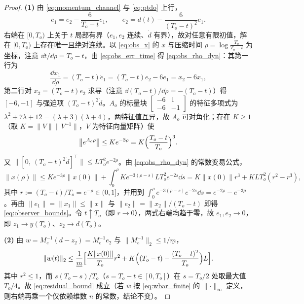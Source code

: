 \begin{proof}
\textbf{(1)} 由 \eqref{eq:momentum_channel} 与 \eqref{eq:ptdo} 上行，
\begin{equation}
\dot e_1=e_2-\frac{6}{T_o-t}e_1,\qquad
\dot e_2=\dot d(t)-\frac{6}{(T_o-t)^{2}}e_1 .
\label{eq:obs_err_time}
\end{equation}
右端在 \([0,T_o)\) 上关于 \(t\) 局部有界（\(e_1,e_2\) 连续、\(\dot d\) 有界），故对任意有限初值，解在 \([0,T_o)\) 上存在唯一且绝对连续。以 \eqref{eq:obs_x} 的 \(x\) 与压缩时间 \(\rho=\log\frac{T_o}{T_o-t}\) 为坐标，注意 \(\dd t/\dd\rho=T_o-t\)，由 \eqref{eq:obs_err_time} 得 \eqref{eq:obs_rho_dyn}：其第一行为
\[
\frac{\dd x_1}{\dd\rho}=(T_o-t)\dot e_1=(T_o-t)e_2-6e_1=x_2-6x_1 ,
\]
第二行对 \(x_2=(T_o-t)e_2\) 求导（注意 \(\dd(T_o-t)/\dd\rho=-(T_o-t)\)）得 \([-6,-1]\) 与强迫项 \((T_o-t)^{2}\dot d\)。\(A_o\) 的标量块 \(\begin{bmatrix}-6&1\\-6&-1\end{bmatrix}\) 的特征多项式为 \(\lambda^{2}+7\lambda+12=(\lambda+3)(\lambda+4)\)，两特征值互异，故 \(A_o\) 可对角化；存在 \(K\ge1\)（取 \(K=\lVert V\rVert\lVert V^{-1}\rVert\)，\(V\) 为特征向量矩阵）使
\[
\bigl\lVert e^{A_o\rho}\bigr\rVert\le Ke^{-3\rho}=K\Bigl(\frac{T_o-t}{T_o}\Bigr)^{3}.
\]
又 \(\bigl\lVert[0,\ (T_o-t)^{2}\dot d]^{\top}\bigr\rVert\le LT_o^{2}e^{-2\rho}\)。由 \eqref{eq:obs_rho_dyn} 的常数变易公式，
\[
\lVert x(\rho)\rVert\le Ke^{-3\rho}\lVert x(0)\rVert
+\int_0^{\rho}Ke^{-3(\rho-s)}LT_o^{2}e^{-2s}\dd s
=K\lVert x(0)\rVert r^{3}+KLT_o^{2}(r^{2}-r^{3}),
\]
其中 \(r:=(T_o-t)/T_o=e^{-\rho}\in(0,1]\)，并用到 \(\int_0^{\rho}e^{-3(\rho-s)}e^{-2s}\dd s=e^{-2\rho}-e^{-3\rho}\)。再由 \(\lVert e_1\rVert=\lVert x_1\rVert\le\lVert x\rVert\) 与 \(\lVert e_2\rVert=\lVert x_2\rVert/(T_o-t)\) 即得 \eqref{eq:observer_bounds}。令 \(t\uparrow T_o\)（即 \(r\to0\)），两式右端均趋于零，故 \(e_1,e_2\to0\)，即 \(z_1\to y(T_o)\)、\(z_2\to d(T_o)\)。

\textbf{(2)} 由 \(w=M_e^{-1}(d-z_2)=M_e^{-1}e_2\) 与 \(\lVert M_e^{-1}\rVert_2\le1/\underline m\)，
\[
\lVert w(t)\rVert_2\le\frac{1}{\underline m}
\Bigl[\frac{K\lVert x(0)\rVert}{T_o}r^{2}
+K\Bigl((T_o-t)-\frac{(T_o-t)^{2}}{T_o}\Bigr)L\Bigr].
\]
其中 \(r^{2}\le1\)，而 \(s(T_o-s)/T_o\)（\(s=T_o-t\in[0,T_o]\)）在 \(s=T_o/2\) 处取最大值 \(T_o/4\)。故 \eqref{eq:residual_bound} 成立（若 \(\bar w\) 按 \eqref{eq:wbar_finite} 的 \(\lVert\cdot\rVert_\infty\) 定义，则右端再乘一个仅依赖维数 \(n\) 的常数，结论不变）。
\end{proof}

